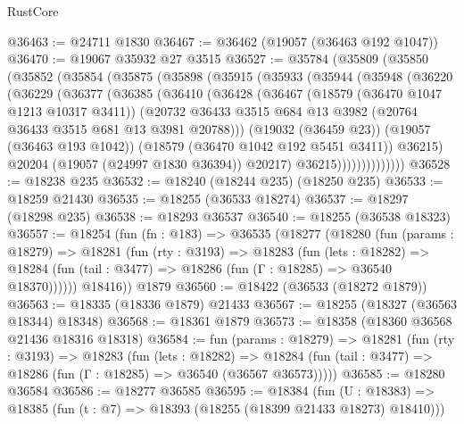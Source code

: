 \begin{lexlean}{RustCore}
\begin{coremodule}
@36463 := @24711 @1830
@36467 := @36462 (@19057 (@36463 @192 @1047))
@36470 := @19067 @35932 @27 @3515
@36527 := @35784
    (@35809
      (@35850
        (@35852
          (@35854
            (@35875
              (@35898
                (@35915
                  (@35933
                    (@35944
                      (@35948
                        (@36220
                          (@36229
                            (@36377
                              (@36385
                                (@36410
                                  (@36428
                                    (@36467
                                      (@18579 (@36470 @1047 @1213 @10317 @3411))
                                      (@20732
                                        @36433
                                        @3515
                                        @684
                                        @13
                                        @3982
                                        (@20764 @36433 @3515 @681 @13 @3981 @20788)))
                                    (@19032 (@36459 @23))
                                    (@19057 (@36463 @193 @1042))
                                    (@18579 (@36470 @1042 @192 @5451 @3411))
                                    @36215)
                                  @20204
                                  (@19057 (@24997 @1830 @36394))
                                  @20217)
                                @36215))))))))))))))
@36528 := @18238 @235
@36532 := @18240 (@18244 @235) (@18250 @235)
@36533 := @18259 @21430
@36535 := @18255 (@36533 @18274)
@36537 := @18297 (@18298 @235)
@36538 := @18293 @36537
@36540 := @18255 (@36538 @18323)
@36557 := @18254
    (fun (fn : @183) =>
    @36535
      (@18277
        (@18280
          (fun (params : @18279) =>
          @18281
            (fun (rty : @3193) =>
            @18283
              (fun (lets : @18282) =>
              @18284 (fun (tail : @3477) => @18286 (fun (Γ : @18285) => @36540 @18370))))))
        @18416))
    @1879
@36560 := @18422 (@36533 (@18272 @1879))
@36563 := @18335 (@18336 @1879) @21433
@36567 := @18255 (@18327 (@36563 @18344) @18348)
@36568 := @18361 @1879
@36573 := @18358 (@18360 @36568 @21436 @18316 @18318)
@36584 := fun (params : @18279) =>
  @18281
    (fun (rty : @3193) =>
    @18283
      (fun (lets : @18282) =>
      @18284 (fun (tail : @3477) => @18286 (fun (Γ : @18285) => @36540 (@36567 @36573)))))
@36585 := @18280 @36584
@36586 := @18277 @36585
@36595 := @18384
    (fun (U : @18383) => @18385 (fun (t : @7) => @18393 (@18255 (@18399 @21433 @18273) @18410)))

\end{coremodule}
\end{lexlean}
